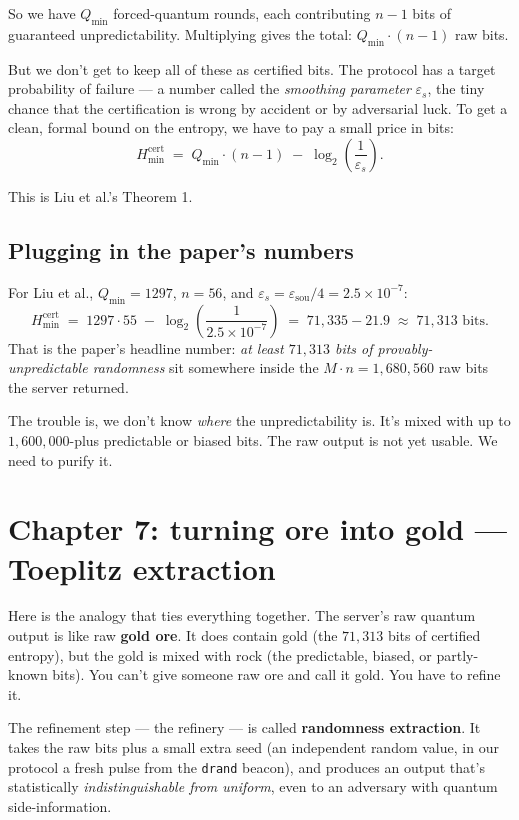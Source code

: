 \documentclass[11pt]{article}
\newcommand{\formula}[1]{\[\boxed{#1}\]}
\newcommand{\Hmin}{H_{\min}}
\newcommand{\Qmin}{Q_{\min}}
\newcommand{\eps}{\varepsilon}
\newcommand{\epss}{\eps_{\!s}}
\newcommand{\epssou}{\eps_{\text{sou}}}
\begin{document}
So we have $\Qmin$ forced-quantum rounds, each contributing $n-1$ bits of guaranteed unpredictability. Multiplying gives the total: $\Qmin \cdot (n-1)$ raw bits.

But we don't get to keep all of these as certified bits. The protocol has a target probability of failure --- a number called the \emph{smoothing parameter} $\epss$, the tiny chance that the certification is wrong by accident or by adversarial luck. To get a clean, formal bound on the entropy, we have to pay a small price in bits:
\formula{\Hmin^{\text{cert}} \;=\; \Qmin \cdot (n-1) \;-\; \log_2\!\left(\frac{1}{\epss}\right).}

\noindent This is Liu et al.'s Theorem 1.

\subsection*{Plugging in the paper's numbers}

For Liu et al., $\Qmin = 1297$, $n=56$, and $\epss = \epssou/4 = 2.5 \times 10^{-7}$:
\[
\Hmin^{\text{cert}}
\;=\; 1297 \cdot 55 \;-\; \log_2\!\left(\frac{1}{2.5\times 10^{-7}}\right)
\;=\; 71{,}335 - 21.9
\;\approx\; \boxed{71{,}313 \text{ bits}}.
\]
That is the paper's headline number: \emph{at least $71{,}313$ bits of provably-unpredictable randomness} sit somewhere inside the $M \cdot n = 1{,}680{,}560$ raw bits the server returned.

The trouble is, we don't know \emph{where} the unpredictability is. It's mixed with up to $1{,}600{,}000$-plus predictable or biased bits. The raw output is not yet usable. We need to purify it.

\section{Chapter 7: turning ore into gold --- Toeplitz extraction}

Here is the analogy that ties everything together. The server's raw quantum output is like raw \textbf{gold ore}. It does contain gold (the $71{,}313$ bits of certified entropy), but the gold is mixed with rock (the predictable, biased, or partly-known bits). You can't give someone raw ore and call it gold. You have to refine it.

The refinement step --- the refinery --- is called \textbf{randomness extraction}. It takes the raw bits plus a small extra seed (an independent random value, in our protocol a fresh pulse from the \texttt{drand} beacon), and produces an output that's statistically \emph{indistinguishable from uniform}, even to an adversary with quantum side-information.
\end{document}
